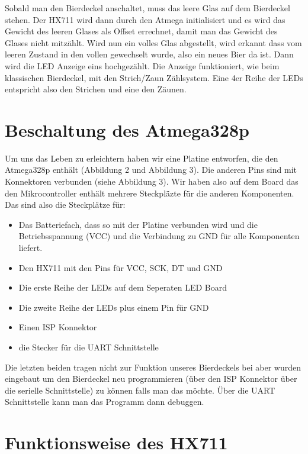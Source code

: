 \documentclass[12pt,journal,compsoc]{IEEEtran}
\begin{document}
Sobald man den Bierdeckel anschaltet, muss das leere Glas auf dem Bierdeckel stehen.
Der HX711 wird dann durch den Atmega initialisiert und es wird das Gewicht des leeren Glases
als Offset errechnet, damit man das Gewicht des Glases nicht mitzählt. Wird nun ein volles Glas
abgestellt, wird erkannt dass vom leeren Zustand in den vollen gewechselt wurde, also ein neues
Bier da ist. Dann wird die LED Anzeige eins hochgezählt. Die Anzeige funktioniert,
wie beim klassischen Bierdeckel, mit den Strich/Zaun Zählsystem. Eine 4er Reihe der LEDs
entspricht also den Strichen und eine den Zäunen.

\section{Beschaltung des Atmega328p}



Um uns das Leben zu erleichtern haben wir eine Platine entworfen, die den Atmega328p enthält
(Abbildung 2 und Abbildung 3). Die anderen Pins sind mit Konnektoren verbunden (siehe Abbildung 3).
Wir haben also auf dem Board das den Mikrocontroller enthält mehrere Steckpläzte für die anderen
Komponenten. Das sind also die Steckplätze für:
\begin{itemize}
 \item Das Batteriefach, dass so mit der Platine verbunden wird und die Betriebsspannung (VCC) und die Verbindung zu GND für alle Komponenten liefert.
 \item Den HX711 mit den Pins für VCC, SCK, DT und GND
 \item Die erste Reihe der LEDs auf dem Seperaten LED Board
 \item Die zweite Reihe der LEDs plus einem Pin für GND
 \item Einen ISP Konnektor
 \item die Stecker für die UART Schnittstelle
\end{itemize}

Die letzten beiden tragen nicht zur Funktion unseres Bierdeckels bei aber wurden eingebaut um den
Bierdeckel neu programmieren (über den ISP Konnektor über die serielle Schnittstelle) zu können
falls man das möchte. Über die UART Schnittstelle kann man das Programm dann debuggen.


\section{Funktionsweise des HX711}
\end{document}
